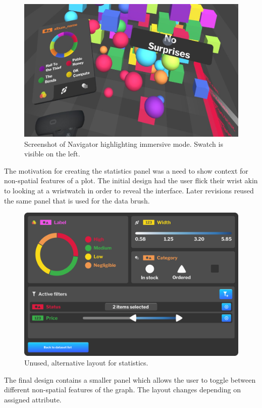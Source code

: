 \documentclass[thesis=M,english,hidelinks]{FITthesisXE}[2012/06/26]
\begin{document}
\begin{figure}[ht]
\centering
\includegraphics[scale=0.35]{statistics}
\caption{Screenshot of Navigator highlighting immersive mode. Swatch is visible on the left.}
\label{fig:statistics}
\end{figure}

The motivation for creating the statistics panel was a need to show context for non-spatial features of a plot. The initial design had the user flick their wrist akin to looking at a wristwatch in order to reveal the interface. Later revisions reused the same panel that is used for the data brush.

\begin{figure}[ht]
\centering
\includegraphics[scale=0.075]{statistics_original}
\caption{Unused, alternative layout for statistics.}
\label{fig:statistics_original}
\end{figure}

The final design contains a smaller panel which allows the user to toggle between different non-spatial features of the graph. The layout changes depending on assigned attribute.
\end{document}
